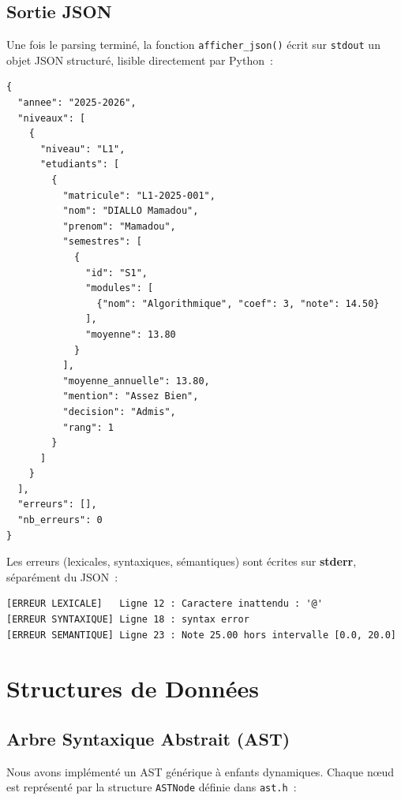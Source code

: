 \documentclass[a4paper,12pt]{article}
\begin{document}
\subsection{Sortie JSON}

Une fois le parsing terminé, la fonction \texttt{afficher\_json()} écrit sur \texttt{stdout} un objet JSON structuré, lisible directement par Python~:

\begin{lstlisting}[caption={Format de sortie JSON du binaire SGN}, style=json, label=lst:json]
{
  "annee": "2025-2026",
  "niveaux": [
    {
      "niveau": "L1",
      "etudiants": [
        {
          "matricule": "L1-2025-001",
          "nom": "DIALLO Mamadou",
          "prenom": "Mamadou",
          "semestres": [
            {
              "id": "S1",
              "modules": [
                {"nom": "Algorithmique", "coef": 3, "note": 14.50}
              ],
              "moyenne": 13.80
            }
          ],
          "moyenne_annuelle": 13.80,
          "mention": "Assez Bien",
          "decision": "Admis",
          "rang": 1
        }
      ]
    }
  ],
  "erreurs": [],
  "nb_erreurs": 0
}
\end{lstlisting}

Les erreurs (lexicales, syntaxiques, sémantiques) sont écrites sur \textbf{stderr}, séparément du JSON~:
\begin{verbatim}
[ERREUR LEXICALE]   Ligne 12 : Caractere inattendu : '@'
[ERREUR SYNTAXIQUE] Ligne 18 : syntax error
[ERREUR SEMANTIQUE] Ligne 23 : Note 25.00 hors intervalle [0.0, 20.0]
\end{verbatim}

\section{Structures de Données}

\subsection{Arbre Syntaxique Abstrait (AST)}

Nous avons implémenté un AST générique à enfants dynamiques. Chaque nœud est représenté par la structure \texttt{ASTNode} définie dans \texttt{ast.h}~:
\end{document}
